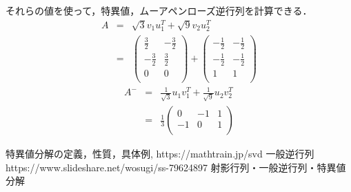 \documentclass[12pt]{jsarticle}
\begin{document}
それらの値を使って，特異値，ムーアペンローズ逆行列を計算できる．
\begin{eqnarray}
  \label{singular_value}
  A &=& \sqrt{3} v_1 u_1^T + \sqrt{9} v_2 u_2^T \\
    &=& \left(\begin{array}{rrcr}
    \frac{3}{2}  & -\frac{3}{2} \\
    -\frac{3}{2} & \frac{3}{2} \\
    0 & 0 \\
    \end{array}\right)
    +
    \left(\begin{array}{rrcr}
    -\frac{1}{2}  & -\frac{1}{2} \\
    -\frac{1}{2}  & -\frac{1}{2} \\
    1 & 1 \\
    \end{array}\right)
\end{eqnarray}
\begin{eqnarray}
  \label{inverse_vector}
  A^- &=& \frac{1}{\sqrt{3}} u_1 v_1^T + \frac{1}{\sqrt{9}} u_2 v_2^T \\
      &=& \frac{1}{3} \left(\begin{array}{rrcr}
       0 & -1 & 1 \\
      -1 &  0 & 1 \\
      \end{array}\right)
\end{eqnarray}

\begin{thebibliography}{9}
   特異値分解の定義，性質，具体例, https://mathtrain.jp/svd
  \bibitem{} 一般逆行列 https://www.slideshare.net/wosugi/ss-79624897
  \bibitem{} 射影行列・一般逆行列・特異値分解 
\end{thebibliography}
\end{document}
